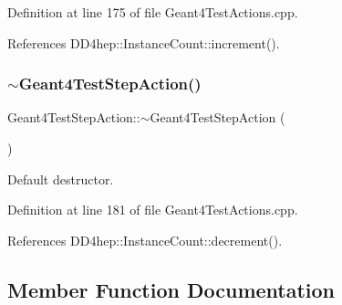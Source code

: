 Definition at line 175 of file Geant4\+Test\+Actions.\+cpp.



References D\+D4hep\+::\+Instance\+Count\+::increment().

\hypertarget{class_d_d4hep_1_1_simulation_1_1_test_1_1_geant4_test_step_action_a0b645a06c4e038b0800054558ad99964}{}\label{class_d_d4hep_1_1_simulation_1_1_test_1_1_geant4_test_step_action_a0b645a06c4e038b0800054558ad99964} 
\subsubsection{\texorpdfstring{$\sim$\+Geant4\+Test\+Step\+Action()}{~Geant4TestStepAction()}}
{\footnotesize\ttfamily Geant4\+Test\+Step\+Action\+::$\sim$\+Geant4\+Test\+Step\+Action (\begin{DoxyParamCaption}{ }\end{DoxyParamCaption})\hspace{0.3cm}{\ttfamily [virtual]}}



Default destructor. 



Definition at line 181 of file Geant4\+Test\+Actions.\+cpp.



References D\+D4hep\+::\+Instance\+Count\+::decrement().



\subsection{Member Function Documentation}
\hypertarget{class_d_d4hep_1_1_simulation_1_1_test_1_1_geant4_test_step_action_a19d915e8a634552f25a839a92843258a}{}\label{class_d_d4hep_1_1_simulation_1_1_test_1_1_geant4_test_step_action_a19d915e8a634552f25a839a92843258a} 
